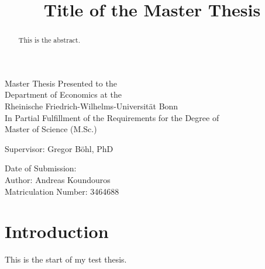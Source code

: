 \documentclass[12pt]{article}
\title{Title of the Master Thesis}
\author{}
\date{}
\numberwithin{equation}{section}
\begin{document}
\maketitle

\vspace{5cm}
\begin{center}
Master Thesis Presented to the\\
Department of Economics at the\\
Rheinische Friedrich-Wilhelms-Universität Bonn\\
\vspace{1cm}
In Partial Fulfillment of the Requirements for the Degree of\\
Master of Science (M.Sc.)
\end{center}

\vspace{5cm}
\begin{center}
Supervisor: Gregor Böhl, PhD

\vspace{2cm}
Date of Submission: \\
Author: Andreas Koundouros\\
Matriculation Number: 3464688
\end{center}

\newpage
{} %
{ \hypersetup{hidelinks} \tableofcontents } %
{ \hypersetup{hidelinks} \listoffigures } %
{ \hypersetup{hidelinks} \listoftables } %

\newpage
{} %
\begin{abstract}
This is the abstract.
\end{abstract}

\newpage
{} %
\section{Introduction}
This is the start of my test thesis.
\end{document}
